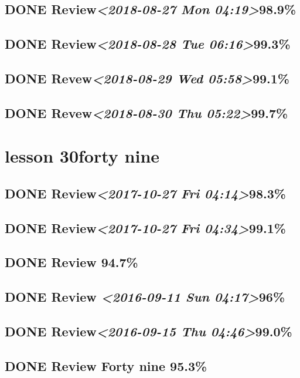 \documentclass[11pt]{ctexart}
\begin{document}
\subsection{{\bfseries\sffamily DONE} Review\textit{<2018-08-27 Mon 04:19>}98.9\%}
\label{sec:org8ba9717}
\subsection{{\bfseries\sffamily DONE} Review\textit{<2018-08-28 Tue 06:16>}99.3\%}
\label{sec:org1a76ecb}
\subsection{{\bfseries\sffamily DONE} Revew\textit{<2018-08-29 Wed 05:58>}99.1\%}
\label{sec:orgaec7c2d}
\subsection{{\bfseries\sffamily DONE} Revew\textit{<2018-08-30 Thu 05:22>}99.7\%}
\label{sec:orge71d0f9}
\section{lesson 30forty nine}
\label{sec:orgc32fa27}
\subsection{{\bfseries\sffamily DONE} Review\textit{<2017-10-27 Fri 04:14>}98.3\%}
\label{sec:orgd25b1dc}
\subsection{{\bfseries\sffamily DONE} Review\textit{<2017-10-27 Fri 04:34>}99.1\%}
\label{sec:org1082b28}
\subsection{{\bfseries\sffamily DONE} Review 94.7\%}
\label{sec:org9ef5525}
\subsection{{\bfseries\sffamily DONE} Review \textit{<2016-09-11 Sun 04:17>}96\%}
\label{sec:orge0bc01e}
\subsection{{\bfseries\sffamily DONE} Review\textit{<2016-09-15 Thu 04:46>}99.0\%}
\label{sec:orgb8be57a}
\subsection{{\bfseries\sffamily DONE} Review Forty nine 95.3\%}
\label{sec:orga487dd4}
\end{document}
